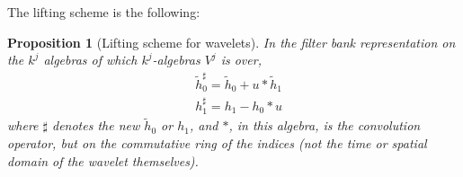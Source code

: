 \documentclass[twoside]{amsart}
\theoremstyle{plain}
\newtheorem{proposition}{Proposition}
\theoremstyle{definition}
\theoremstyle{remark}
\numberwithin{equation}{section}
\begin{document}
\begin{comment}
\begin{tikzpicture}
  \matrix (m) [matrix of math nodes, row sep=3em, column sep=7em, minimum width=3em]
  {
         & H_0\cdot \phi(z) & \downarrow 2 \circ H_0\cdot \phi(z)  & \widetilde{\phi}(z)     \\
 \phi(z) & -S\cdot \phi(z)  & \widetilde{\psi}(z)                  &  \\
         & H_1\cdot \phi(z) & \downarrow 2 \circ H_1 \cdot \phi(z) & 
\\ };
  \path[|->]
  (m-2-1) edge node [above] {$H_0 \cdot$} (m-1-2)
          edge node [above] {$-S\cdot $ } (m-2-2)
           edge node [below] {$H_1 \cdot $} (m-3-2)
  (m-1-2) edge node [above] {$\downarrow 2$} (m-1-3) 
  (m-1-3) edge node [above] {$ +S\cdot \widetilde{\psi}(z) $} (m-1-4) 
  (m-2-2) edge node [above] {$+\psi(z)$ } (m-2-3)
  (m-2-3) edge node [above] {$S\cdot $} (m-1-4)         
  (m-3-2) edge node [above] {$\downarrow 2$} (m-3-3) 
  (m-3-3) edge node [auto] {$- S \cdot$} (m-2-3);
\end{tikzpicture}

and for the spaces we are on

\begin{tikzpicture}
  \matrix (m) [matrix of math nodes, row sep=3em, column sep=7em, minimum width=3em]
  {
                  & \mathcal{F}[V^1]  & \mathcal{F}[V^0]  & \mathcal{F}[V^1]      \\
 \mathcal{F}[V^1] & \mathcal{F}[V^1]  & \mathcal{F}[V^0]  &  \\
                  & \mathcal{F}[V^1]  & \mathcal{F}[W^0] & 
\\ };
  \path[|->]
  (m-2-1) edge node [above] {$H_0 \cdot$} (m-1-2)
          edge node [above] {$-S\cdot $ } (m-2-2)
           edge node [below] {$H_1 \cdot $} (m-3-2)
  (m-1-2) edge node [above] {$\downarrow 2$} (m-1-3) 
  (m-1-3) edge node [above] {$ +S\cdot \widetilde{\psi}(z) $} (m-1-4) 
  (m-2-2) edge node [above] {$+\psi(z)$ } (m-2-3)
  (m-2-3) edge node [above] {$S\cdot $} (m-1-4)         
  (m-3-2) edge node [above] {$\downarrow 2$} (m-3-3) 
  (m-3-3) edge node [auto] {$- S \cdot$} (m-2-3);
\end{tikzpicture}

\end{comment}

The lifting scheme is the following:
\begin{proposition}[Lifting scheme for wavelets]\label{Prop:Liftingscheme}
In the filter bank representation on the $k^j$ algebras of which $k^j$-algebras $V^j$ is over,
\begin{equation}
\begin{aligned}
  & \widetilde{h}_0^{\sharp} = \widetilde{h}_0 + u * \widetilde{h}_1 \\
  & h_1^{\sharp} = h_1 - h_0 * u
\end{aligned}
\end{equation}
where $\sharp$ denotes the new $\widetilde{h}_0$ or $h_1$, and $*$, in this algebra, is the convolution operator, but on the commutative ring of the indices (\emph{not} the time or spatial domain of the wavelet themselves).  
\end{proposition}
\end{document}
